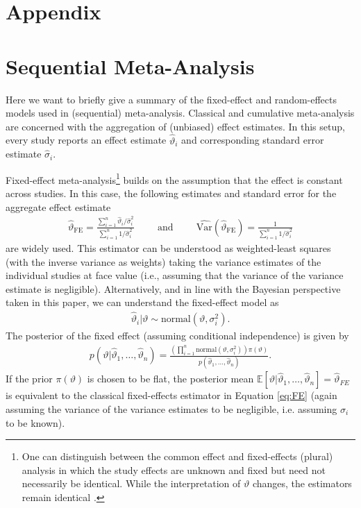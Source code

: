 \section*{Appendix}
\section{Sequential Meta-Analysis}
\label{sec:Meta_analysis}
Here we want to briefly give a summary of the fixed-effect and random-effects models used in (sequential) meta-analysis. 
Classical \citep{Whitehead_2002,Cooper_2009} and cumulative \citep{Higgins_Whitehead_Simmonds_2011} meta-analysis are concerned with the 
aggregation of (unbiased) effect estimates. In this setup, every study reports an effect estimate $\hat \vartheta_i$ and corresponding standard error estimate $\hat \sigma_i$.

Fixed-effect meta-analysis\footnote{One can distinguish between the common effect and fixed-effects (plural) analysis in which the study effects are unknown and fixed but need not necessarily be identical. While the interpretation of $\vartheta$ changes, the estimators remain identical \citep{Rice_2018}.} builds on the assumption that the effect is constant across studies. In this case, the following estimates and standard error for the aggregate effect estimate 
\begin{align}
\label{eq:FE}
    \hat \vartheta_{\text{FE}} = \frac{\sum_{i=1}^n \hat \vartheta_i/\hat \sigma_i^2}{\sum_{i=1}^n 1/\hat \sigma_i^2}
\hspace{1cm} \text{and}\hspace{1cm} 
   \widehat{\text{Var}} (\hat \vartheta_{\text{FE}}) = \frac{1}{\sum_{i=1}^n 1/\hat \sigma_i^2}
\end{align}
are widely used. This estimator can be understood as weighted-least squares (with the inverse variance as weights) taking the variance estimates of the individual studies at face value (i.e., assuming that the variance of the variance estimate is negligible).
Alternatively, and in line with the Bayesian perspective taken in this paper, we can understand the fixed-effect model as 
\begin{align}\nonumber
    \hat \vartheta_i \lvert \vartheta \sim \text{normal}(\vartheta, \sigma^2_i).
\end{align}
The posterior of the fixed effect (assuming conditional independence) is given by
\begin{align}\nonumber
    p(\vartheta \lvert \hat \vartheta_1, \dots , \hat \vartheta_n) = \frac{\left(\prod_{i=1}^n \text{normal}(\vartheta, \sigma^2_i)\right) \pi(\vartheta)}{p(\hat \vartheta_1, \dots , \hat \vartheta_n)}.
\end{align}
If the prior $\pi(\vartheta)$ is chosen to be flat, the posterior mean $\mathbb{E}[\vartheta \lvert \hat \vartheta_1, \dots , \hat \vartheta_n] = \hat \vartheta_{FE}$ is equivalent to the classical fixed-effects estimator in Equation \ref{eq:FE} (again assuming the variance of the variance estimates to be negligible, i.e. assuming $\sigma_i$ to be known).

